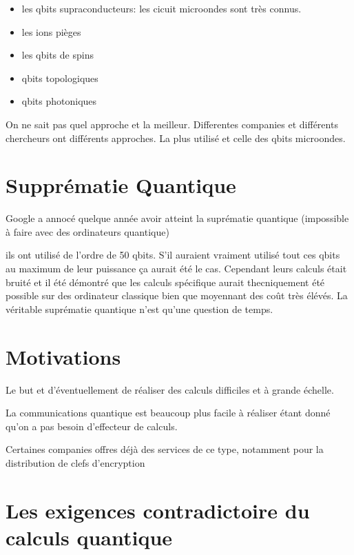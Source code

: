\begin{itemize}
	\item les qbits supraconducteurs: les cicuit microondes sont très connus.
	\item les ions pièges
	\item les qbits de spins
	\item qbits topologiques
	\item qbits photoniques
\end{itemize}

On ne sait pas quel approche et la meilleur. Differentes companies et différents chercheurs ont différents approches. La plus utilisé et celle des qbits microondes.

\section*{Supprématie Quantique}

Google a annocé quelque année avoir atteint la suprématie quantique (impossible à faire avec des ordinateurs quantique)

ils ont utilisé de l'ordre de 50 qbits. S'il auraient vraiment utilisé tout ces qbits au maximum de leur puissance ça aurait été le cas. Cependant leurs calculs était bruité et il été démontré que les calculs spécifique aurait thecniquement été possible sur des ordinateur classique bien que moyennant des coût très élévés. La véritable suprématie quantique n'est qu'une question de temps.

\section*{Motivations}

Le but et d'éventuellement de réaliser des calculs difficiles et à grande échelle.

\begin{tcolorbox}[title=Communication quantique]
	La communications quantique est beaucoup plus facile à réaliser étant donné qu'on a pas besoin d'effecteur de calculs.

	Certaines companies offres déjà des services de ce type, notamment pour la distribution de clefs d'encryption

	 
\end{tcolorbox}


\section*{Les exigences contradictoire du calculs quantique}

